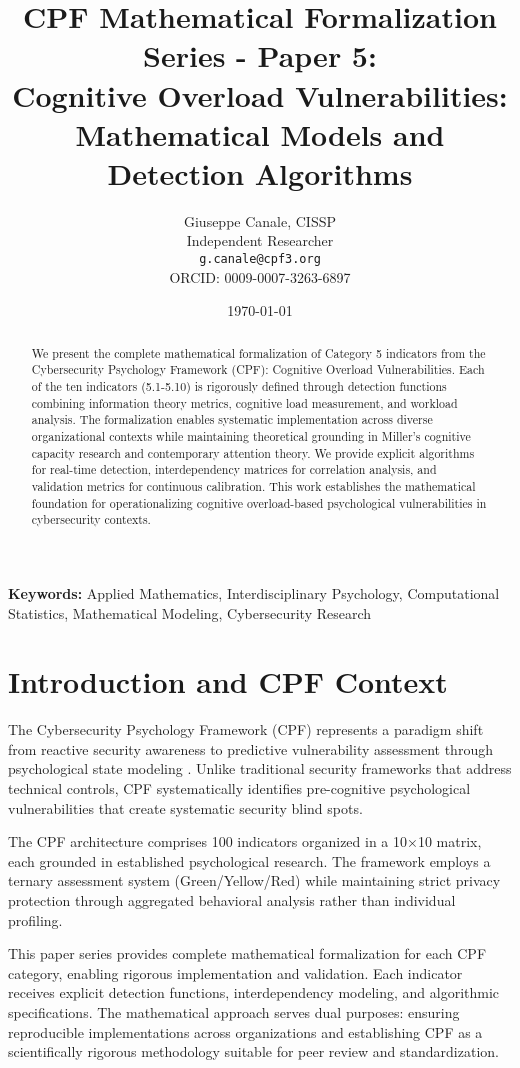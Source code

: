 \documentclass[11pt,a4paper]{article}
\title{CPF Mathematical Formalization Series - Paper 5:\\Cognitive Overload Vulnerabilities: Mathematical Models and Detection Algorithms}
\author{
    Giuseppe Canale, CISSP\\
    Independent Researcher\\
    \texttt{g.canale@cpf3.org}\\
    ORCID: 0009-0007-3263-6897
}
\date{\today}
\begin{document}
\maketitle

\begin{abstract}
We present the complete mathematical formalization of Category 5 indicators from the Cybersecurity Psychology Framework (CPF): Cognitive Overload Vulnerabilities. Each of the ten indicators (5.1-5.10) is rigorously defined through detection functions combining information theory metrics, cognitive load measurement, and workload analysis. The formalization enables systematic implementation across diverse organizational contexts while maintaining theoretical grounding in Miller's cognitive capacity research and contemporary attention theory. We provide explicit algorithms for real-time detection, interdependency matrices for correlation analysis, and validation metrics for continuous calibration. This work establishes the mathematical foundation for operationalizing cognitive overload-based psychological vulnerabilities in cybersecurity contexts.
\end{abstract}

\textbf{Keywords:} Applied Mathematics, Interdisciplinary Psychology, Computational Statistics, Mathematical Modeling, Cybersecurity Research

\section{Introduction and CPF Context}

The Cybersecurity Psychology Framework (CPF) represents a paradigm shift from reactive security awareness to predictive vulnerability assessment through psychological state modeling \cite{canale2024cpf}. Unlike traditional security frameworks that address technical controls, CPF systematically identifies pre-cognitive psychological vulnerabilities that create systematic security blind spots.

The CPF architecture comprises 100 indicators organized in a 10×10 matrix, each grounded in established psychological research. The framework employs a ternary assessment system (Green/Yellow/Red) while maintaining strict privacy protection through aggregated behavioral analysis rather than individual profiling.

This paper series provides complete mathematical formalization for each CPF category, enabling rigorous implementation and validation. Each indicator receives explicit detection functions, interdependency modeling, and algorithmic specifications. The mathematical approach serves dual purposes: ensuring reproducible implementations across organizations and establishing CPF as a scientifically rigorous methodology suitable for peer review and standardization.
\end{document}
